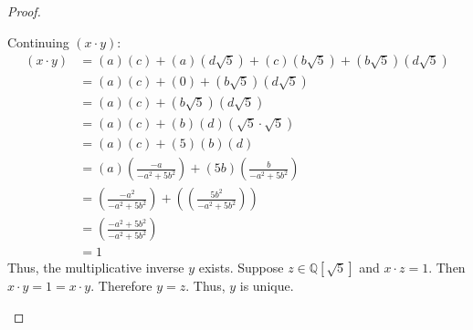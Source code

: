 \documentclass{article}
\begin{document}
\begin{proof}
\begin{description}
           Continuing $(x \cdot y)$:
           \begin{align*}
             (x \cdot y) &= (a)(c) + (a)(d\sqrt{5}) + (c)(b\sqrt{5}) + (b\sqrt{5})(d\sqrt{5})\\
                         &= (a)(c) + (0) + (b\sqrt{5})(d\sqrt{5})\\
                         &= (a)(c) + (b\sqrt{5})(d\sqrt{5})\\
                         &= (a)(c) + (b)(d)(\sqrt{5} \cdot \sqrt{5})\\
                         &= (a)(c) + (5)(b)(d) \\
                         &= (a)(\frac{-a}{-a^2+5b^2}) + (5b)(\frac{b}{-a^2+5b^2}) \\
                         &= (\frac{-a^2}{-a^2+5b^2}) + ((\frac{5b^2}{-a^2+5b^2}))\\
                         &= (\frac{-a^2+5b^2}{-a^2+5b^2}) \\
                         &= 1
           \end{align*}
           Thus, the multiplicative inverse $y$ exists. Suppose $z \in \mathbb{Q}[\sqrt{5}]$
           and $x \cdot z = 1$. Then $x \cdot y = 1 = x \cdot y$. Therefore $ y = z$. Thus, $y$
           is unique.
    \end{description}
    
    
  \end{proof}
\end{document}
